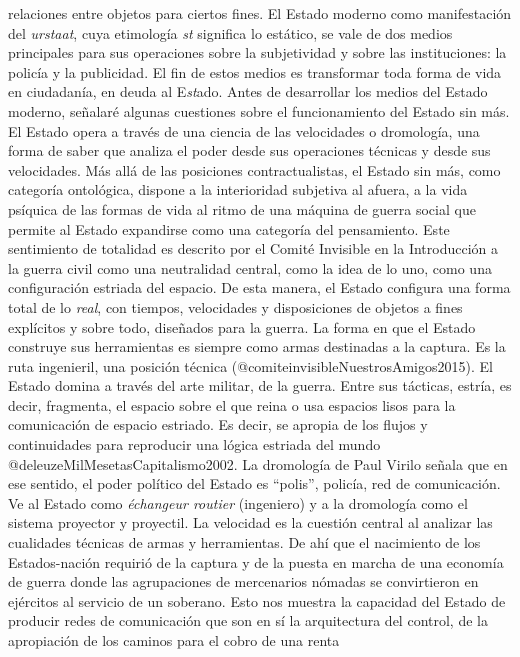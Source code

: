 \documentclass[
]{article}
\begin{document}
relaciones entre objetos para ciertos fines. El Estado moderno como
manifestación del \emph{urstaat}, cuya etimología \emph{st} significa lo
estático, se vale de dos medios principales para sus operaciones sobre
la subjetividad y sobre las instituciones: la policía y la publicidad.
El fin de estos medios es transformar toda forma de vida en ciudadanía,
en deuda al E\emph{st}ado. Antes de desarrollar los medios del Estado
moderno, señalaré algunas cuestiones sobre el funcionamiento del Estado
sin más. El Estado opera a través de una ciencia de las velocidades o
dromología, una forma de saber que analiza el poder desde sus
operaciones técnicas y desde sus velocidades. Más allá de las posiciones
contractualistas, el Estado sin más, como categoría ontológica, dispone
a la interioridad subjetiva al afuera, a la vida psíquica de las formas
de vida al ritmo de una máquina de guerra social que permite al Estado
expandirse como una categoría del pensamiento. Este sentimiento de
totalidad es descrito por el Comité Invisible en la Introducción a la
guerra civil como una neutralidad central, como la idea de lo uno, como
una configuración estriada del espacio. De esta manera, el Estado
configura una forma total de lo \emph{real}, con tiempos, velocidades y
disposiciones de objetos a fines explícitos y sobre todo, diseñados para
la guerra. La forma en que el Estado construye sus herramientas es
siempre como armas destinadas a la captura. Es la ruta ingenieril, una
posición técnica (@comiteinvisibleNuestrosAmigos2015). El Estado domina
a través del arte militar, de la guerra. Entre sus tácticas, estría, es
decir, fragmenta, el espacio sobre el que reina o usa espacios lisos
para la comunicación de espacio estriado. Es decir, se apropia de los
flujos y continuidades para reproducir una lógica estriada del mundo
@deleuzeMilMesetasCapitalismo2002. La dromología de Paul Virilo señala
que en ese sentido, el poder político del Estado es ``polis'', policía,
red de comunicación. Ve al Estado como \emph{échangeur routier}
(ingeniero) y a la dromología como el sistema proyector y proyectil. La
velocidad es la cuestión central al analizar las cualidades técnicas de
armas y herramientas. De ahí que el nacimiento de los Estados-nación
requirió de la captura y de la puesta en marcha de una economía de
guerra donde las agrupaciones de mercenarios nómadas se convirtieron en
ejércitos al servicio de un soberano. Esto nos muestra la capacidad del
Estado de producir redes de comunicación que son en sí la arquitectura
del control, de la apropiación de los caminos para el cobro de una renta
\end{document}
